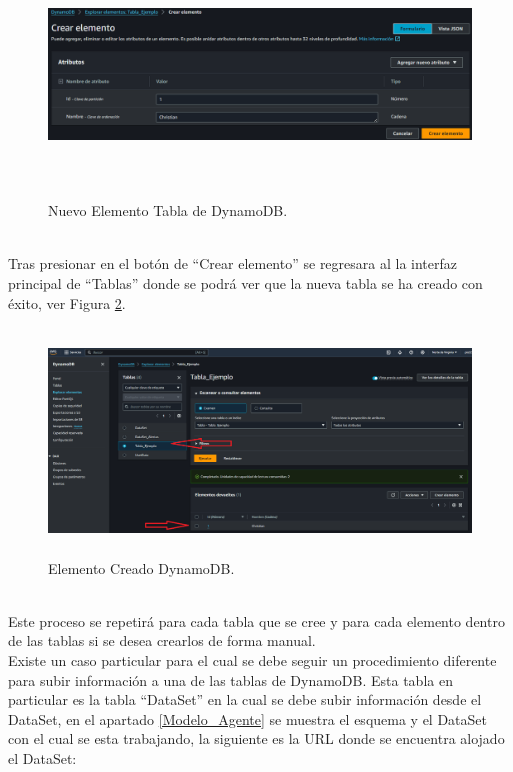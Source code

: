 \documentclass[a4paper,10pt, oneside, titlepage]{article}
\begin{document}
	\begin{figure}[!h]
		\centering
		\includegraphics[width = 1\linewidth, height = 6.5cm]{Nuevo_Elemento_DynamoDB.png}
		\caption{Nuevo Elemento Tabla de DynamoDB.}
		\label{Nuevo_Elemento_DynamoDB}
	\end{figure} \\
	\indent Tras presionar en el botón de ``Crear elemento'' se regresara al la interfaz principal de ``Tablas'' donde se podrá ver que la nueva tabla se ha creado con éxito, ver Figura \ref{Elemento_Creado_DynamoDB}.
	\begin{figure}[!h]
		\centering
		\includegraphics[width = 1\linewidth, height = 6cm]{Elemento_Creado_DynamoDB.png}
		\caption{Elemento Creado DynamoDB.}
		\label{Elemento_Creado_DynamoDB}
	\end{figure} \\
	\indent Este proceso se repetirá para cada tabla que se cree y para cada elemento dentro de las tablas si se desea crearlos de forma manual. \\\newline
	\indent Existe un caso particular para el cual se debe seguir un procedimiento diferente para subir información a una de las tablas de DynamoDB. Esta tabla en particular es la tabla ``DataSet'' en la cual se debe subir información desde el DataSet, en el apartado \ref{Modelo_Agente} se muestra el esquema y el DataSet con el cual se esta trabajando, la siguiente es la URL donde se encuentra alojado el DataSet:
\end{document}

